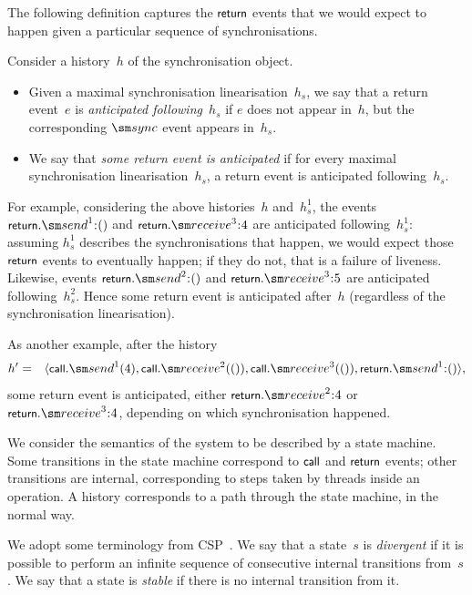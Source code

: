 
The following definition captures the $\mbox{\sf{\small return}}$ events that we would expect to
happen given a particular sequence of synchronisations.
%
\begin{definition}
Consider a  history~$h$ of the synchronisation object.
%
\begin{itemize}
\item Given a maximal synchronisation linearisation~$h_s$, we say that a
  return event~$e$ is \emph{anticipated following~$h_s$} if $e$ does not
  appear in~$h$, but the corresponding $\sync$ event appears in~$h_s$.

\item We say that \emph{some return event is anticipated} if for every maximal
  synchronisation linearisation~$h_s$, a return event is anticipated
  following~$h_s$.
\end{itemize}
\end{definition}
%
For example, considering the above histories~$h$ and~$h_s^1$, the events
$\return.\send^1\::()$ and $\return.\receive^3\::4$ are anticipated
following~$h_s^1$: assuming $h_s^1$ describes the synchronisations that
happen, we would expect those $\mbox{\sf{\small return}}$ events to eventually happen; if they
do not, that is a failure of liveness.  Likewise, events
$\return.\send^2\::()$ and $\return.\receive^3\::5$ are anticipated
following~$h_s^2$.  Hence some return event is anticipated after~$h$
(regardless of the synchronisation linearisation).  

As another example, after the history 
\begin{eqnarray*}
h' & =  & \seq{\call.\send^1(4),
  \call.\receive^2(()), \call.\receive^3(()), \return.\send^1\::() },
\end{eqnarray*}
some return event is anticipated, either $\return.\receive^2\::4$ or
$\return.\receive^3\::4$, depending on which synchronisation happened. 

We consider the semantics of the system to be described by a state machine.
Some transitions in the state machine correspond to $\mbox{\sf{\small call}}$ and $\mbox{\sf{\small return}}$
events; other transitions are internal, corresponding to steps taken by
threads inside an operation.  A history corresponds to a path through the
state machine, in the normal way.

We adopt some terminology from CSP~\cite{awr:ucs}.
We say that a state~$s$ is \emph{divergent} if it is possible to perform an
infinite sequence of consecutive internal transitions from~$s$.  We say that a
state is \emph{stable} if there is no internal transition from it.

